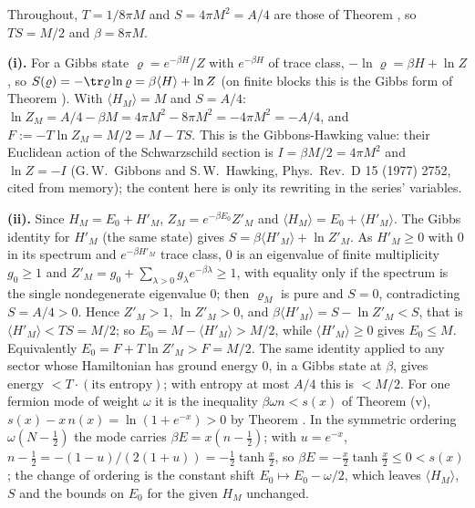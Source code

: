 Throughout, $T = 1/8\pi M$ and $S = 4\pi M^{2} = A/4$ are those of Theorem , so $TS = M/2$ and $\beta = 8\pi M$.

\textbf{(i).} For a Gibbs state $\varrho = e^{-\beta H}/Z$ with $e^{-\beta H}$ of trace class, $-\ln\varrho = \beta H + \ln Z$, so $S(\varrho) = -\tr\varrho\ln\varrho = \beta\langle H\rangle + \ln Z$ (on finite blocks this is the Gibbs form of Theorem ). With $\langle H_M\rangle = M$ and $S = A/4$: $\ln Z_M = A/4 - \beta M = 4\pi M^{2} - 8\pi M^{2} = -4\pi M^{2} = -A/4$, and $F := -T\ln Z_M = M/2 = M - TS$. This is the Gibbons-Hawking value: their Euclidean action of the Schwarzschild section is $I = \beta M/2 = 4\pi M^{2}$ and $\ln Z = -I$ (G.\,W.~Gibbons and S.\,W.~Hawking, Phys.\ Rev.\ D 15 (1977) 2752, cited from memory); the content here is only its rewriting in the series' variables.

\textbf{(ii).} Since $H_M = E_0 + H'_M$, $Z_M = e^{-\beta E_0}Z'_M$ and $\langle H_M\rangle = E_0 + \langle H'_M\rangle$. The Gibbs identity for $H'_M$ (the same state) gives $S = \beta\langle H'_M\rangle + \ln Z'_M$. As $H'_M \geq 0$ with $0$ in its spectrum and $e^{-\beta H'_M}$ trace class, $0$ is an eigenvalue of finite multiplicity $g_0 \geq 1$ and $Z'_M = g_0 + \sum_{\lambda > 0}g_\lambda e^{-\beta\lambda} \geq 1$, with equality only if the spectrum is the single nondegenerate eigenvalue $0$; then $\varrho_M$ is pure and $S = 0$, contradicting $S = A/4 > 0$. Hence $Z'_M > 1$, $\ln Z'_M > 0$, and $\beta\langle H'_M\rangle = S - \ln Z'_M < S$, that is $\langle H'_M\rangle < TS = M/2$; so $E_0 = M - \langle H'_M\rangle > M/2$, while $\langle H'_M\rangle \geq 0$ gives $E_0 \leq M$. Equivalently $E_0 = F + T\ln Z'_M > F = M/2$. The same identity applied to any sector whose Hamiltonian has ground energy $0$, in a Gibbs state at $\beta$, gives energy $< T\cdot(\text{its entropy})$; with entropy at most $A/4$ this is $< M/2$. For one fermion mode of weight $\omega$ it is the inequality $\beta\omega n < s(x)$ of Theorem (v), $s(x) - x\,n(x) = \ln(1 + e^{-x}) > 0$ by Theorem . In the symmetric ordering $\omega(N - \tfrac12)$ the mode carries $\beta E = x(n - \tfrac12)$; with $u = e^{-x}$, $n - \tfrac12 = -(1 - u)/(2(1 + u)) = -\tfrac12\tanh\tfrac{x}{2}$, so $\beta E = -\tfrac{x}{2}\tanh\tfrac{x}{2} \leq 0 < s(x)$; the change of ordering is the constant shift $E_0 \mapsto E_0 - \omega/2$, which leaves $\langle H_M\rangle$, $S$ and the bounds on $E_0$ for the given $H_M$ unchanged.

